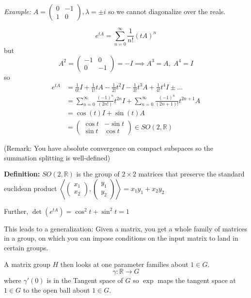 \documentclass[12pt]{article}
\newcommand{\R}{\mathbb{R}}
\newcommand{\brak}[1]{\left\langle #1 \right\rangle}
\begin{document}
    \emph{Example:} $A = \begin{pmatrix}
        0 & -1\\ 
        1 & 0
    \end{pmatrix}, \lambda = \pm i$ so we cannot diagonalize over the reals. 

    \[e^{tA} = \sum_{n=0}^{\infty} \frac{1}{n!}(tA)^n\] 
    but 
    \[A^2 = \begin{pmatrix}
        -1 & 0\\ 
        0 & -1
    \end{pmatrix} = -I \implies A^3 = A, \; A^4 = I\]
    so 
    \begin{align*}
        e^{tA} &= \frac{1}{0!} I + \frac{1}{1!}tA - \frac{1}{2!}t^2 I - \frac{1}{3!}t^3A + \frac{1}{4!}t^4 I \pm \dots\\ 
            &= \sum_{n=0}^{\infty} \frac{(-1)^n}{(2n!)} t^{2n} I + \sum_{n=0}^{\infty} \frac{(-1)^n}{(2n + 1)!} t^{2n + 1} A\\ 
            &= \cos(t)I + \sin(t)A\\ 
            &= \begin{pmatrix}
                \cos t & -\sin t\\
                \sin t & \cos t
            \end{pmatrix} \in SO(2, \R)
    \end{align*}

    (Remark: You have absolute convergence on compact subspaces so the summation splitting is well-defined)

    \textbf{Definition:} $SO(2, \R)$ is the group of $2\times 2$ matrices that preserve the standard euclidean product $\brak{\begin{pmatrix}
        x_1\\x_2
    \end{pmatrix}, \begin{pmatrix}
        y_1\\y_2
    \end{pmatrix}} = x_1 y_1 + x_2 y_2$

    Further, $\det(e^{tA}) = \cos^2 t+ \sin^2 t = 1$ 

    This leads to a generalization: Given a matrix, you get a whole family of matrices in a group, on which you can impose conditions on the input matrix to land in certain groups. 

    A matrix group $H$ then looks at one parameter families about $1 \in G$. 
    \[\gamma: \R \to G\]
    where $\gamma'(0)$ is in the Tangent space of $G$ so $\exp$ maps the tangent space at $1 \in G$ to the open ball about $1 \in G$. 
\end{document}

